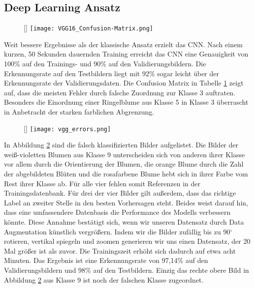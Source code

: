 \documentclass[11pt,a4paper]{article}
\begin{document}
\subsection{Deep Learning Ansatz}
\begin{figure}
	\raisebox{0pt}[\dimexpr{}\baselineskip\relax]{
	\texttt{[image: VGG16\_Confusion-Matrix.png]}
	}
	\label{tab:cm_vgg}
\end{figure}
Weit bessere Ergebnisse als der klassische Ansatz erzielt das CNN. Nach einem kurzen, 50 Sekunden dauernden Training erreicht das CNN eine Genauigkeit von 100\% auf den Trainings- und 90\% auf den Validierungsbildern. Die Erkennungsrate auf den Testbildern liegt mit 92\% sogar leicht über der Erkennungsrate der Validierungsdaten. Die Confusion Matrix in Tabelle \ref{tab:cm_vgg} zeigt auf, dass die meisten Fehler durch falsche Zuordnung zur Klasse 3 auftraten. Besonders die Einordnung einer Ringelblume aus Klasse 5 in Klasse 3 überrascht in Anbetracht der starken farblichen Abgrenzung.
\\
\begin{figure}
	\raisebox{0pt}[\dimexpr{}\baselineskip\relax]{
	\texttt{[image: vgg\_errors.png]}
	}
	\label{fig:vgg-misses}
\end{figure}

In Abbildung \ref{fig:vgg-misses} sind die falsch klassifizierten Bilder aufgelistet. Die Bilder der weiß-violetten Blumen aus Klasse 9 unterscheiden sich von anderen ihrer Klasse vor allem durch die Orientierung der Blumen, die orange Blume durch die Zahl der abgebildeten Blüten und die rosafarbene Blume hebt sich in ihrer Farbe vom Rest ihrer Klasse ab. Für alle vier fehlen somit Referenzen in der Trainingsdatenbank. Für drei der vier Bilder gilt außerdem, dass das richtige Label an zweiter Stelle in den besten Vorhersagen steht. Beides weist darauf hin, dass eine umfassendere Datenbasis die Performance des Modells verbessern könnte. Diese Annahme bestätigt sich, wenn wir unseren Datensatz durch Data Augmentation künstlich vergrößern. Indem wir die Bilder zufällig bis zu 90$^\circ$ rotieren, vertikal spiegeln und zoomen generieren wir uns einen Datensatz, der 20 Mal größer ist als zuvor. Die Trainingszeit erhöht sich dadurch auf etwa acht Minuten. Das Ergebnis ist eine Erkennungsrate von 97,14\% auf den Validierungsbildern und 98\% auf den Testbildern. Einzig das rechte obere Bild in Abbildung \ref{fig:vgg-misses} aus Klasse 9 ist noch der falschen Klasse zugeordnet.
\end{document}

